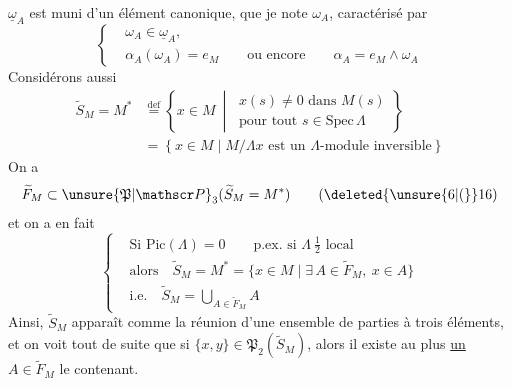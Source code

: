 $\underline{\omega}_A$ est muni d'un élément canonique, que je note $\omega_A$, caractérisé par
\[
\left\{\begin{aligned}
&\omega_A\in\underline{\omega}_A,\\
&\alpha_A(\omega_A)=e_M\qquad\text{ou encore}\qquad\alpha_A=e_M\wedge\omega_A
\end{aligned}\right.\tag*{(14)}
\]
Considérons aussi
\[
\begin{aligned}
\widetilde S_M=M^*&\overset{\mathrm{def}}{=}\left\{x\in M\ \middle|\ \begin{gathered}
x(s)\ne0\text{ dans }M(s)\\ \text{pour tout }s\in\mathrm{Spec}\,\Lambda\end{gathered}\right\}\\
&=\left\{x\in M\mid M/\Lambda x\text{ est un }\Lambda\text{-module inversible}\right\}
\end{aligned}\tag*{(15)}
\]
On a  
\[
\widetilde F_M\subset\unsure{\mathfrak P|\mathscr P}_3(\widetilde S_M=M^*)\tag*{(\deleted{\unsure{6|(}}16)}
\]
et on a en fait
\[
\left\{\begin{aligned}
&\text{Si }\mathrm{Pic}(\Lambda)=0\qquad\text{p.ex. si }\Lambda\ \tfrac12\text{ local}\\
&\text{alors}\quad\widetilde S_M=M^*=\{x\in M\mid\exists\, A\in\widetilde F_M,\ x\in A\}\\
&\text{i.e.}\quad\widetilde S_M=\bigcup_{A\in\widetilde F_M} A
\end{aligned}\right.\tag*{(17)}
\]
Ainsi, $\widetilde S_M$ apparaît comme la réunion d'une ensemble  de parties à trois éléments, et on voit tout de suite que si $\{x,y\}\in\mathfrak P_2(\widetilde S_M)$, alors il existe au plus \uline{un} $A\in\widetilde F_M$ le contenant.
